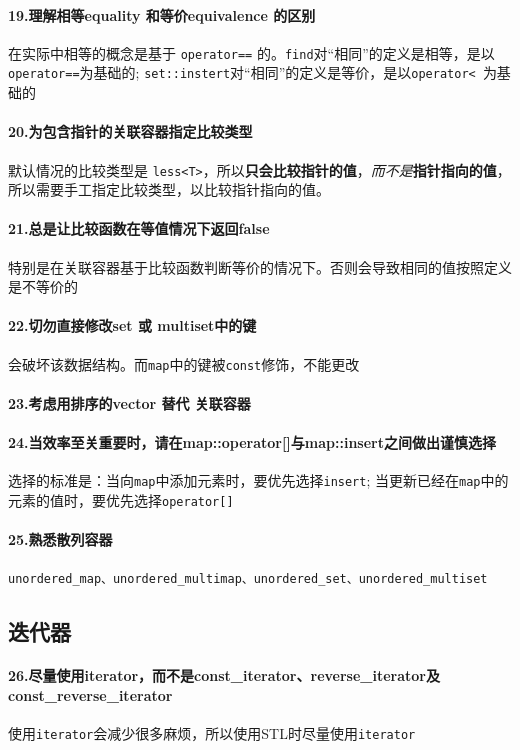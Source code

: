 \documentclass[UTF8,a4paper,12pt]{ctexbook}
\begin{document}
			\paragraph{19.理解相等equality 和等价equivalence 的区别} 在实际中相等的概念是基于 \verb|operator==| 的。\verb|find|对“相同”的定义是相等，是以 \verb|operator==|为基础的; \verb|set::instert|对“相同”的定义是等价，是以\verb|operator< |为基础的
			
			\paragraph{20.为包含指针的关联容器指定比较类型}	默认情况的比较类型是 \verb|less<T>|，所以\textbf{只会比较指针的值}，\textit{而不是}\textbf{指针指向的值}，所以需要手工指定比较类型，以比较指针指向的值。
			
			\paragraph{21.总是让比较函数在等值情况下返回false} 特别是在关联容器基于比较函数判断等价的情况下。否则会导致相同的值按照定义是不等价的
			\paragraph{22.切勿直接修改set 或 multiset中的键} 会破坏该数据结构。而\verb|map|中的键被\verb|const|修饰，不能更改
			\paragraph{23.考虑用排序的vector 替代 关联容器}
			\paragraph{24.当效率至关重要时，请在map::operator[]与map::insert之间做出谨慎选择} 选择的标准是：当向\verb|map|中添加元素时，要优先选择\verb|insert|; 当更新已经在\verb|map|中的元素的值时，要优先选择\verb|operator[]|
			\paragraph{25.熟悉散列容器} \verb|unordered_map、unordered_multimap、unordered_set、unordered_multiset|
		\subsection{迭代器}
			\paragraph{26.尽量使用iterator，而不是const\_iterator、reverse\_iterator及const\_reverse\_iterator} 使用\verb|iterator|会减少很多麻烦，所以使用STL时尽量使用\verb|iterator|
			
\end{document}
